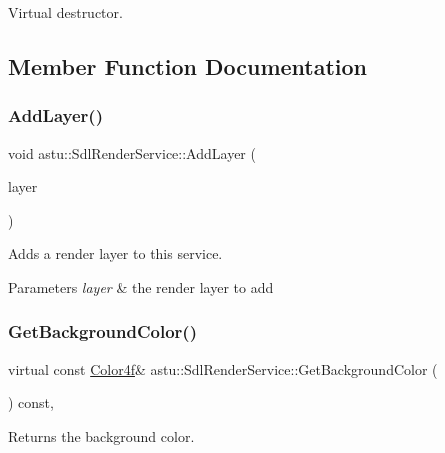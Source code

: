 Virtual destructor. 

\subsection{Member Function Documentation}
\mbox{\label{classastu_1_1SdlRenderService_a94b8e424f9e7332cc5c81051196b43f7}} 
\subsubsection{\texorpdfstring{Add\+Layer()}{AddLayer()}}
{\footnotesize\ttfamily void astu\+::\+Sdl\+Render\+Service\+::\+Add\+Layer (\begin{DoxyParamCaption}\item[{\hyperlink{classastu_1_1ISdlRenderLayer}{I\+Sdl\+Render\+Layer} \&}]{layer }\end{DoxyParamCaption})}

Adds a render layer to this service.


\begin{DoxyParams}{Parameters}
{\em layer} & the render layer to add \\
\hline
\end{DoxyParams}
\mbox{\label{classastu_1_1SdlRenderService_ae6e14e9be46ab88a1e04fa6ac7c5aa2c}} 
\subsubsection{\texorpdfstring{Get\+Background\+Color()}{GetBackgroundColor()}}
{\footnotesize\ttfamily virtual const \hyperlink{classastu_1_1Color}{Color4f}\& astu\+::\+Sdl\+Render\+Service\+::\+Get\+Background\+Color (\begin{DoxyParamCaption}{ }\end{DoxyParamCaption}) const\hspace{0.3cm}{\ttfamily [override]}, {\ttfamily [virtual]}}

Returns the background color.

